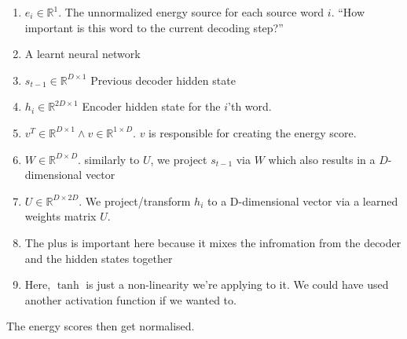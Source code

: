 \documentclass[11pt]{article}
\begin{document}
\begin{enumerate}
    \item \label{eq:ei} $e_i \in \mathbb R ^1$. The unnormalized energy source for each source word $i$. ``How important is this word to the current decoding step?''
    \item \label{eq:a} A learnt neural network 
    \item \label{eq:st-1} $s_{t-1} \in \mathbb R ^{D\times 1}$  Previous decoder hidden state 
    \item \label{eq:hi} $h_i \in \mathbb{R}^{2D\times 1}$ Encoder hidden state for the $i$'th word.
    \item \label{eq:vT} $v^T \in \mathbb R^{D\times 1} \wedge v \in \mathbb R^{1\times D}$. $v$ is responsible for creating the energy score.
    \item \label{eq:W} $W \in \mathbb R^{D\times D}$. similarly to $U$, we project $s_{t-1}$ via $W$ which also results in a $D$-dimensional vector
    \item \label{eq:U} $U \in \mathbb R^{D\times 2D}$. We project/transform $h_i$ to a D-dimensional vector via a learned weights matrix $U$.
    \item \label{eq:+} The plus is important here because it mixes the infromation from the decoder and the hidden states together
    \item  \label{eq:tanh} Here, $\tanh$ is just a non-linearity we're applying to it. We could have used another activation function if we wanted to.
\end{enumerate}

The energy scores then get normalised.
\end{document}
